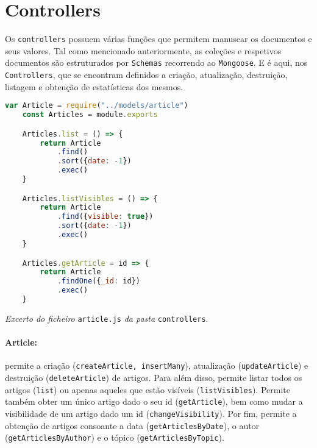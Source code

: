 \section{Controllers}\label{c:controllers}

Os \texttt{controllers} possuem várias funções que permitem manusear os documentos e seus valores. Tal como mencionado anteriormente, as coleções e respetivos documentos são estruturados por \texttt{Schemas} recorrendo ao \texttt{Mongoose}. E é aqui, nos \texttt{Controllers}, que se encontram definidos a criação, atualização, destruição, listagem e obtenção de estatísticas dos mesmos.

\begin{framed}
\begin{lstlisting}[language=JavaScript]
    var Article = require("../models/article")
    const Articles = module.exports

    Articles.list = () => {
        return Article
            .find()
            .sort({date: -1})
            .exec()
    }

    Articles.listVisibles = () => {
        return Article
            .find({visible: true})
            .sort({date: -1})
            .exec()
    }

    Articles.getArticle = id => {
        return Article
            .findOne({_id: id})
            .exec()
    }
\end{lstlisting}
\end{framed}

\begin{center}
\textit{Excerto do ficheiro} \texttt{article.js} \textit{da pasta} \texttt{controllers}.
\end{center}

\paragraph{Article:} permite a criação (\texttt{createArticle, insertMany}), atualização (\texttt{updateArticle}) e destruição (\texttt{deleteArticle}) de artigos. Para além disso, permite listar todos os artigos (\texttt{list}) ou apenas aqueles que estão visíveis (\texttt{listVisibles}). Permite também obter um único artigo dado o seu id (\texttt{getArticle}), bem como mudar a visibilidade de um artigo dado um id (\texttt{changeVisibility}). Por fim, permite a obtenção de artigos consoante a data (\texttt{getArticlesByDate}), o autor (\texttt{getArticlesByAuthor}) e o tópico (\texttt{getArticlesByTopic}).

